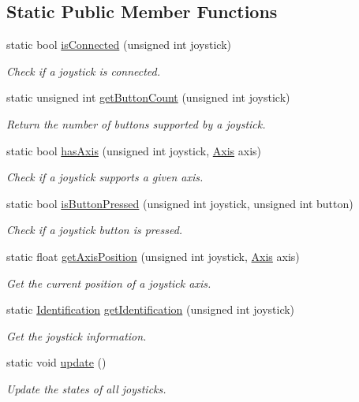 \subsection*{Static Public Member Functions}
\begin{DoxyCompactItemize}
\item 
static bool \mbox{\hyperlink{classsf_1_1_joystick_ac7d4e1923e9f9420174f26703ea63d6c}{is\+Connected}} (unsigned int joystick)
\begin{DoxyCompactList}\small\item\em Check if a joystick is connected. \end{DoxyCompactList}\item 
static unsigned int \mbox{\hyperlink{classsf_1_1_joystick_a4de9f445c6582bfe9f0873f695682885}{get\+Button\+Count}} (unsigned int joystick)
\begin{DoxyCompactList}\small\item\em Return the number of buttons supported by a joystick. \end{DoxyCompactList}\item 
static bool \mbox{\hyperlink{classsf_1_1_joystick_a268e8f2a11ae6af4a47c727cb4ab4d95}{has\+Axis}} (unsigned int joystick, \mbox{\hyperlink{classsf_1_1_joystick_a48db337092c2e263774f94de6d50baa7}{Axis}} axis)
\begin{DoxyCompactList}\small\item\em Check if a joystick supports a given axis. \end{DoxyCompactList}\item 
static bool \mbox{\hyperlink{classsf_1_1_joystick_ae0d97a4b84268cbe6a7078e1b2717835}{is\+Button\+Pressed}} (unsigned int joystick, unsigned int button)
\begin{DoxyCompactList}\small\item\em Check if a joystick button is pressed. \end{DoxyCompactList}\item 
static float \mbox{\hyperlink{classsf_1_1_joystick_aea4930193331df1851b709f3060ba58b}{get\+Axis\+Position}} (unsigned int joystick, \mbox{\hyperlink{classsf_1_1_joystick_a48db337092c2e263774f94de6d50baa7}{Axis}} axis)
\begin{DoxyCompactList}\small\item\em Get the current position of a joystick axis. \end{DoxyCompactList}\item 
static \mbox{\hyperlink{structsf_1_1_joystick_1_1_identification}{Identification}} \mbox{\hyperlink{classsf_1_1_joystick_aa917c9435330e6e0368d3893672d1b74}{get\+Identification}} (unsigned int joystick)
\begin{DoxyCompactList}\small\item\em Get the joystick information. \end{DoxyCompactList}\item 
static void \mbox{\hyperlink{classsf_1_1_joystick_ab85fa9175b4edd3e5a07ee3cde0b0f48}{update}} ()
\begin{DoxyCompactList}\small\item\em Update the states of all joysticks. \end{DoxyCompactList}\end{DoxyCompactItemize}



